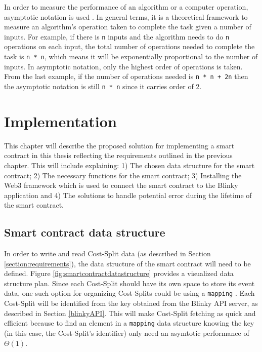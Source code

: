 \documentclass[twoside,draftfooter]{tutthesis} %
\begin{document}
In order to measure the performance of an algorithm or a computer operation, asymptotic notation is used \citep{AlgorithmAndDataStructure}. In general terms, it is a theoretical framework to measure an algorithm's operation taken to complete the task given a number of inputs. For example, if there is \texttt{n} inputs and the algorithm needs to do \texttt{n} operations on each input, the total number of operations needed to complete the task is \texttt{n * n}, which means it will be exponentially proportional to the number of inputs. In asymptotic notation, only the highest order of operations is taken. From the last example, if the number of operations needed is \texttt{n * n + 2n} then the asymptotic notation is still \texttt{n * n} since it carries order of 2.

\chapter{Implementation}
\label{ch:implementation}

This chapter will describe the proposed solution for implementing a smart contract in this thesis reflecting the requirements outlined in the previous chapter. This will include explaining: 1) The chosen data structure for the smart contract; 2) The necessary functions for the smart contract; 3) Installing the Web3 framework which is used to connect the smart contract to the Blinky application and 4) The solutions to handle potential error during the lifetime of the smart contract.

\section{Smart contract data structure}
\label{section:DataStructure}

In order to write and read Cost-Split data (as described in Section \ref{section:requirements}), the data structure of the smart contract will need to be defined. Figure \ref{fig:smartcontractdatastructure} provides a visualized data structure plan. Since each Cost-Split should have its own space to store its event data, one such option for organizing Cost-Splits could be using a \texttt{mapping} \citep{SolidityMapping}. Each Cost-Split will be identified from the key obtained from the Blinky API server, as described in Section \ref{blinkyAPI}. This will make Cost-Split fetching as quick and efficient because to find an element in a \texttt{mapping} data structure knowing the key (in this case, the Cost-Split's identifier) only need an asymtotic performance of $\Theta(1)$. 
\end{document}
